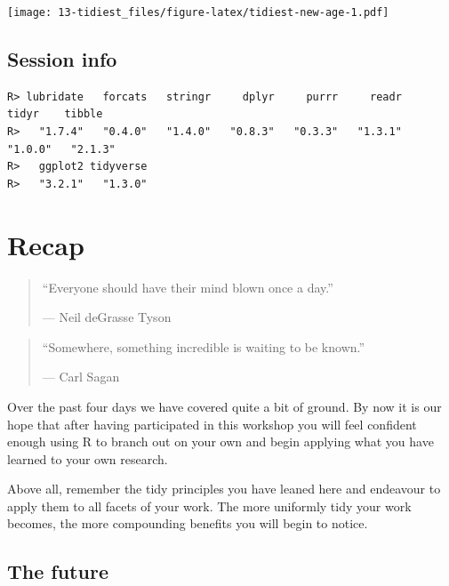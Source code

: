 \documentclass[
]{book}
\newenvironment{Shaded}{\begin{snugshade}}{\end{snugshade}}
\newcommand{\KeywordTok}[1]{\textcolor[rgb]{0.13,0.29,0.53}{\textbf{#1}}}
\newcommand{\NormalTok}[1]{#1}
\newcommand{\OperatorTok}[1]{\textcolor[rgb]{0.81,0.36,0.00}{\textbf{#1}}}
\newcommand{\StringTok}[1]{\textcolor[rgb]{0.31,0.60,0.02}{#1}}
\begin{document}
\texttt{[image: 13-tidiest\_files/figure-latex/tidiest-new-age-1.pdf]}

\hypertarget{session-info-11}{%
\section{Session info}\label{session-info-11}}

\begin{Shaded}
\end{Shaded}

\begin{verbatim}
R> lubridate   forcats   stringr     dplyr     purrr     readr     tidyr    tibble 
R>   "1.7.4"   "0.4.0"   "1.4.0"   "0.8.3"   "0.3.3"   "1.3.1"   "1.0.0"   "2.1.3" 
R>   ggplot2 tidyverse 
R>   "3.2.1"   "1.3.0"
\end{verbatim}

\hypertarget{recap}{%
\chapter{Recap}\label{recap}}

\begin{quote}
``Everyone should have their mind blown once a day.''

--- Neil deGrasse Tyson
\end{quote}

\begin{quote}
``Somewhere, something incredible is waiting to be known.''

--- Carl Sagan
\end{quote}

Over the past four days we have covered quite a bit of ground. By now it is our hope that after having participated in this workshop you will feel confident enough using R to branch out on your own and begin applying what you have learned to your own research.

Above all, remember the tidy principles you have leaned here and endeavour to apply them to all facets of your work. The more uniformly tidy your work becomes, the more compounding benefits you will begin to notice.

\hypertarget{the-future}{%
\section{The future}\label{the-future}}
\end{document}
